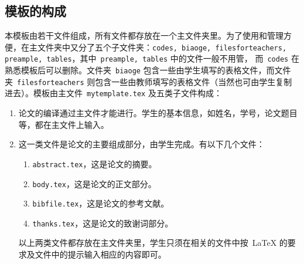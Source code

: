 \subsection{模板的构成}\label{subsec:1}
本模板由若干文件组成，所有文件都存放在一个主文件夹里。为了使用和管理方便，在主文件夹中又分了五个子文件夹：{\tt codes, biaoge, filesforteachers, preample, tables}，其中~{\tt preample, tables} 中的文件一般不用管，
而~{\tt codes} 在熟悉模板后可以删除。文件夹~{\tt biaoge} 包含一些由学生填写的表格文件，而文件夹~{\tt filesforteachers} 则包含一些由教师填写的表格文件（当然也可由学生复制进去）。模板由主文件~{\tt mytemplate.tex} 及五类子文件构成：
\begin{enumerate}
	\item 论文的编译通过主文件才能进行。学生的基本信息，如姓名，学号，论文题目等，都在主文件上输入。
	\item\label{item:2} 这一类文件是论文的主要组成部分，由学生完成。有以下几个文件：
	\begin{enumerate}
		\item {\tt abstract.tex}，这是论文的摘要。
		\item {\tt body.tex}，这是论文的正文部分。
		\item {\tt bibfile.tex}，这是论文的参考文献。
		\item {\tt thanks.tex}，这是论文的致谢词部分。
	\end{enumerate}
	以上两类文件都存放在主文件夹里，学生只须在相关的文件中按~\LaTeX\index{\LaTeX} 的要求及文件中的提示输入相应的内容即可。

\end{enumerate}
